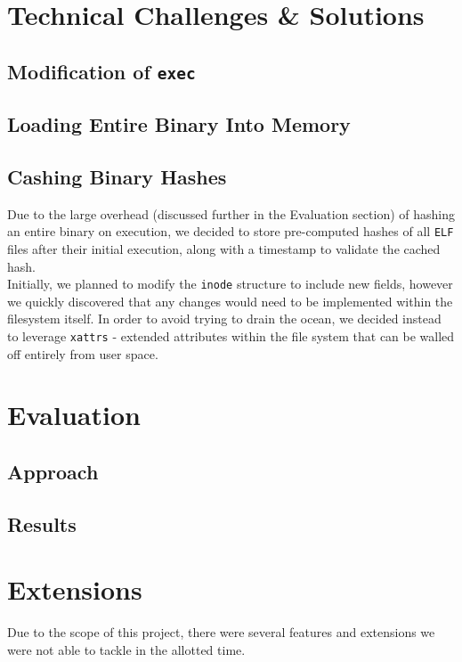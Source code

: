 \documentclass[12pt, letterpaper]{report}
\begin{document}
\section{Technical Challenges \& Solutions}

	\subsection{Modification of \texttt{exec}}

	\subsection{Loading Entire Binary Into Memory}

	\subsection{Cashing Binary Hashes}
		Due to the large overhead (discussed further in the Evaluation section) of hashing an entire binary on execution, we decided to store pre-computed hashes of all \texttt{ELF} files after their initial execution, along with a timestamp to validate the cached hash. \\
		
		Initially, we planned to modify the \texttt{inode} structure to include new fields, however we quickly discovered that any changes would need to be implemented within the filesystem itself. In order to avoid trying to drain the ocean, we decided instead to leverage \texttt{xattrs} - extended attributes within the file system that can be walled off entirely from user space.
	
\section{Evaluation}
	\subsection{Approach}
	\subsection{Results}

\section{Extensions}
	Due to the scope of this project, there were several features and extensions we were not able to tackle in the allotted time. 
\end{document}
